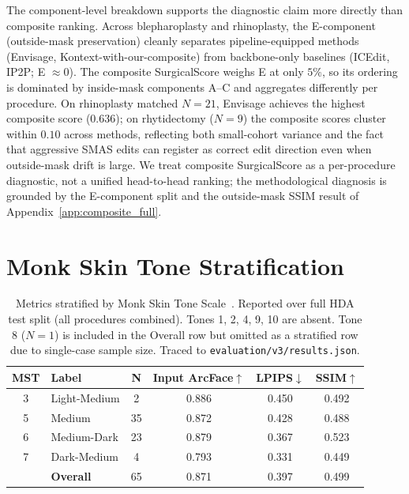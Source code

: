 \documentclass{article}
\newcommand{\method}{Envisage}
\begin{document}
The component-level breakdown supports the diagnostic claim more directly than
composite ranking. Across blepharoplasty and rhinoplasty, the E-component
(outside-mask preservation) cleanly separates pipeline-equipped methods
(\method{}, Kontext-with-our-composite) from backbone-only baselines
(ICEdit, IP2P; E $\approx 0$). The composite SurgicalScore weighs E at
only $5\%$, so its ordering is dominated by inside-mask components
A--C and aggregates differently per procedure. On rhinoplasty matched
$N{=}21$, \method{} achieves the highest composite score ($0.636$);
on rhytidectomy ($N{=}9$) the composite scores cluster within
$0.10$ across methods, reflecting both small-cohort variance and the
fact that aggressive SMAS edits can register as correct edit direction
even when outside-mask drift is large. We treat composite SurgicalScore
as a per-procedure diagnostic, not a unified head-to-head ranking; the
methodological diagnosis is grounded by the E-component split and the
outside-mask SSIM result of Appendix~\ref{app:composite_full}.

\section{Monk Skin Tone Stratification}
\label{app:fairness}

\begin{table}[h]
\centering
\small
\caption{Metrics stratified by Monk Skin Tone Scale~\citep{monk2023monk}.
Reported over full HDA test split (all procedures combined). Tones 1, 2, 4,
9, 10 are absent. Tone 8 ($N{=}1$) is included in the Overall row but omitted
as a stratified row due to single-case sample size. Traced to \texttt{evaluation/v3/results.json}.}
\begin{tabular}{@{}clcccc@{}}
\toprule
\textbf{MST} & \textbf{Label} & \textbf{N} &
\textbf{Input ArcFace}$\uparrow$ & \textbf{LPIPS}$\downarrow$ &
\textbf{SSIM}$\uparrow$ \\
\midrule
3  & Light-Medium  &  2 & 0.886 & 0.450 & 0.492 \\
5  & Medium        & 35 & 0.872 & 0.428 & 0.488 \\
6  & Medium-Dark   & 23 & 0.879 & 0.367 & 0.523 \\
7  & Dark-Medium   &  4 & 0.793 & 0.331 & 0.449 \\
\midrule
   & \textbf{Overall} & 65 & 0.871 & 0.397 & 0.499 \\
\bottomrule
\end{tabular}
\end{table}
\end{document}
